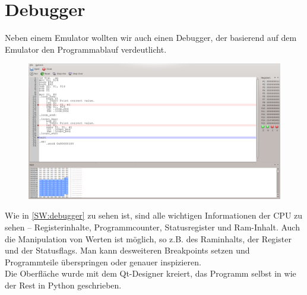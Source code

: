 \section{Debugger}
Neben einem Emulator wollten wir auch einen Debugger, der basierend auf dem Emulator den Programmablauf verdeutlicht.
\begin{figure}[htb]
\centering
\includegraphics[width=\textwidth]{images/debugger.png}
\end{figure}
Wie in \autoref{SW:debugger} zu sehen ist, sind alle wichtigen Informationen der CPU zu sehen -- Registerinhalte, Programmcounter, Statusregister und Ram-Inhalt.
Auch die Manipulation von Werten ist möglich, so z.B. des Raminhalts, der Register und der Statusflags. Man kann desweiteren Breakpoints setzen und Programmteile überspringen oder genauer inspizieren.\\
Die Oberfläche wurde mit dem Qt-Designer kreiert, das Programm selbst in wie der Rest in Python geschrieben.
